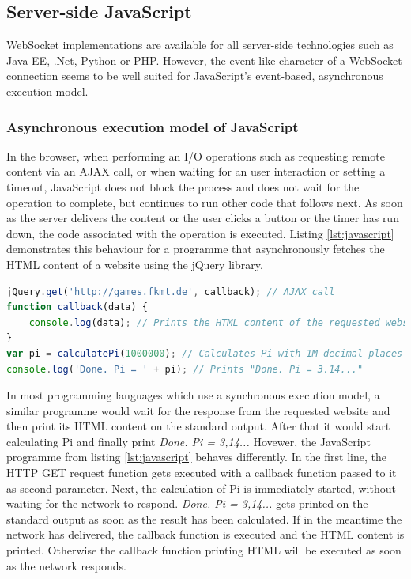 \subsection{Server-side JavaScript}
\label{sub:imp:server}

WebSocket implementations are available for all server-side technologies such as Java EE, .Net, Python or PHP. However, the event-like character of a WebSocket connection seems to be well suited for JavaScript's event-based, asynchronous execution model. 

\subsubsection{Asynchronous execution model of JavaScript}
\label{sub:sub:async}

In the browser, when performing an I/O operations such as requesting remote content via an AJAX call, or when waiting for an user interaction or setting a timeout, JavaScript does not block the process and does not wait for the operation to complete, but continues to run other code that follows next. As soon as the server delivers the content or the user clicks a button or the timer has run down, the code associated with the operation is executed. Listing \ref{lst:javascript} demonstrates this behaviour for a programme that asynchronously fetches the HTML content of a website using the jQuery library.

\begin{lstlisting}[language=Javascript, caption=JavaScript's asynchronous execution model, label=lst:javascript]
jQuery.get('http://games.fkmt.de', callback); // AJAX call
function callback(data) {
    console.log(data); // Prints the HTML content of the requested website 
}
var pi = calculatePi(1000000); // Calculates Pi with 1M decimal places
console.log('Done. Pi = ' + pi); // Prints "Done. Pi = 3.14..."
\end{lstlisting}
In most programming languages which use a synchronous execution model, a similar programme would wait for the response from the requested website and then print its HTML content on the standard output. After that it would  start calculating Pi and finally print \textit{Done. Pi = 3,14...} Hovewer, the JavaScript programme from listing \ref{lst:javascript} behaves differently. In the first line, the HTTP GET request function gets executed with a callback function passed to it as second parameter. Next, the calculation of Pi is immediately started, without waiting for the network to respond. \textit{Done. Pi = 3,14...} gets printed on the standard output as soon as the result has been calculated. If in the meantime the network has delivered, the callback function is executed and the HTML content is printed. Otherwise the callback function printing HTML will be executed as soon as the network responds.

